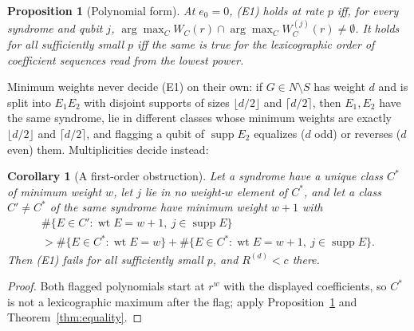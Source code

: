\documentclass[11pt,a4paper]{article}
\theoremstyle{plain}
\newtheorem{proposition}[theorem]{Proposition}
\newtheorem{corollary}[theorem]{Corollary}
\theoremstyle{definition}
\theoremstyle{remark}
\newcommand{\supp}{\operatorname{supp}}
\newcommand{\wt}{\operatorname{wt}}
\begin{document}
\begin{proposition}[Polynomial form]\label{prop:lex}
At $e_0=0$, (E1) holds at rate $p$ iff, for every syndrome and qubit $j$, $\arg\max_CW_C(r)\cap\arg\max_CW^{(j)}_C(r)\ne\emptyset$. It holds for all sufficiently small $p$ iff the same is true for the lexicographic order of coefficient sequences read from the lowest power.
\end{proposition}

\noindent Minimum weights never decide (E1) on their own: if $G\in N\setminus S$ has weight $d$ and is split into $E_1E_2$ with disjoint supports of sizes $\lfloor d/2\rfloor$ and $\lceil d/2\rceil$, then $E_1,E_2$ have the same syndrome, lie in different classes whose minimum weights are exactly $\lfloor d/2\rfloor$ and $\lceil d/2\rceil$, and flagging a qubit of $\supp E_2$ equalizes ($d$ odd) or reverses ($d$ even) them. Multiplicities decide instead:

\begin{corollary}[A first-order obstruction]\label{cor:first-order-e1}
Let a syndrome have a unique class $C^\ast$ of minimum weight $w$, let $j$ lie in no weight-$w$ element of $C^\ast$, and let a class $C'\ne C^\ast$ of the same syndrome have minimum weight $w+1$ with
\begin{multline*}
\#\{E\in C':\wt E=w+1,\ j\in\supp E\}\\
>\#\{E\in C^\ast:\wt E=w\}+\#\{E\in C^\ast:\wt E=w+1,\ j\in\supp E\}.
\end{multline*}
Then (E1) fails for all sufficiently small $p$, and $R^{(d)}<c$ there.
\end{corollary}
\begin{proof}
Both flagged polynomials start at $r^w$ with the displayed coefficients, so $C^\ast$ is not a lexicographic maximum after the flag; apply Proposition~\ref{prop:lex} and Theorem~\ref{thm:equality}.
\end{proof}
\end{document}
